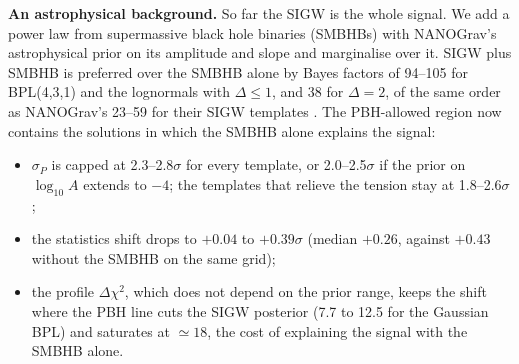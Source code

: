 \documentclass[11pt,a4paper]{article}
\begin{document}
\textbf{An astrophysical background.} So far the SIGW is the whole signal. We add a power law from
supermassive black hole binaries (SMBHBs) with NANOGrav's astrophysical prior on its amplitude and
slope \cite{NG15np} and marginalise over it. SIGW plus SMBHB is preferred over the SMBHB alone by
Bayes factors of 94--105 for BPL(4,3,1) and the lognormals with $\Delta\le1$, and 38 for
$\Delta=2$, of the same order as NANOGrav's 23--59 for their SIGW templates \cite{NG15np}. The
PBH-allowed region now contains the solutions in which the SMBHB alone explains the signal:
\begin{itemize}
\item $\sigma_P$ is capped at 2.3--2.8$\sigma$ for every template, or 2.0--2.5$\sigma$ if the
prior on $\log_{10}A$ extends to $-4$; the templates that relieve the tension stay at
1.8--2.6$\sigma$;
\item the statistics shift drops to $+0.04$ to $+0.39\sigma$ (median $+0.26$, against $+0.43$
without the SMBHB on the same grid);
\item the profile $\Delta\chi^2$, which does not depend on the prior range, keeps the shift where
the PBH line cuts the SIGW posterior (7.7 to 12.5 for the Gaussian BPL) and saturates at
$\simeq18$, the cost of explaining the signal with the SMBHB alone.
\end{itemize}
\end{document}
